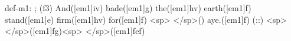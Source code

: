 def-m1: \grealign;
(f3) And([em1]iv) bade([em1]g) the([em1]hv) earth([em1]f) stand([em1]e) firm([em1]hv) for([em1]f) <sp> </sp>() aye.([em1]f) (::) <sp> </sp>([em1]fg)<sp>   </sp>([em1]fef)
